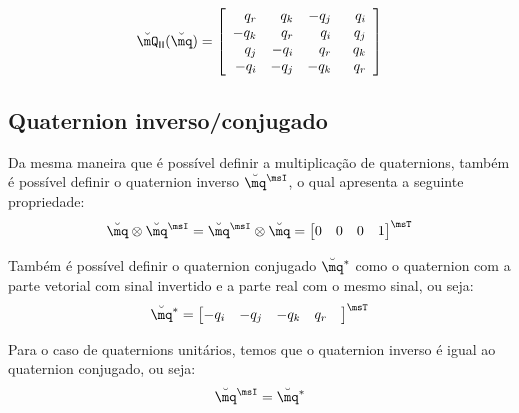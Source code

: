 \documentclass[]{politex}
\begin{document}
\begin{equation} \label{eq:ProdQuat2}
\breve{\mQ}_{\mathsf{I}\mathsf{I}} (\breve{\mq}) =
\begin{bmatrix}
\begin{array}{rrrr}
q_r & q_k & -q_j & \;\; q_i \\
-q_k & q_r & q_i & \;\; q_j \\
q_j & -q_i & q_r & \;\; q_k \\
-q_i & -q_j & - q_k  & \;\; q_r
\end{array}
\end{bmatrix}
\end{equation}

\subsection{Quaternion inverso/conjugado}
Da mesma maneira que é possível definir a multiplicação de quaternions, também é possível definir o quaternion inverso $\breve{\mq}^\msI$, o qual apresenta a seguinte propriedade:
\begin{equation}
\breve{\mq} \otimes \breve{\mq}^\msI = \breve{\mq}^\msI \otimes \breve{\mq} = \begin{bmatrix}
0 & 0 & 0 & 1
\end{bmatrix}^\msT
\end{equation}

Também é possível definir o quaternion conjugado $\breve{\mq}^*$ como o quaternion com a parte vetorial com sinal invertido e a parte real com o mesmo sinal, ou seja:
\begin{equation}
\breve{\mq}^* = \begin{bmatrix}
-q_i & -q_j & -q_k & q_r &
\end{bmatrix}^\msT
\end{equation}

Para o caso de quaternions unitários, temos que o quaternion inverso é igual ao quaternion conjugado, ou seja:
\begin{equation}
\breve{\mq}^\msI = \breve{\mq}^*
\end{equation}
\end{document}
